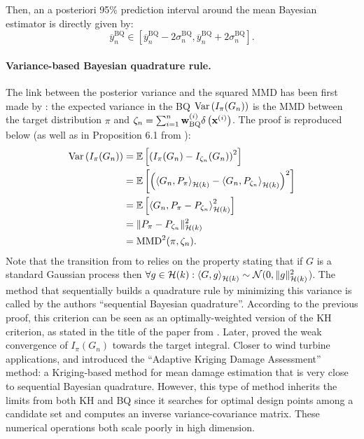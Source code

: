 Then, an a posteriori 95\% prediction interval around the mean Bayesian estimator is directly given by: 
\begin{equation}
   \overline{y}_n^{\mathrm{BQ}} \in \left[\overline{y}_n^{\mathrm{BQ}} - 2\sigma_n^{\mathrm{BQ}}, \overline{y}_n^{\mathrm{BQ}} + 2\sigma_n^{\mathrm{BQ}} \right].
\end{equation}

\paragraph{Variance-based Bayesian quadrature rule.}%
The link between the posterior variance and the squared MMD has been first made by \cite[Proposition 1]{husar_duvenaud_2012}: the expected variance in the BQ $\operatorname{Var}\left(I_{\pi}(G_n)\right)$ is the MMD between the target distribution $\pi$ and $\zeta_n = \sum_{i=1}^n \mathbf{w}_{\mathrm{BQ}}^{(i)} \delta\left({\bf x}^{(i)}\right)$. 
The proof is reproduced below (as well as in Proposition 6.1 from \citealp{kanagawa_2018}): 
\begin{subequations}
\begin{align}
    \operatorname{Var}\left(I_{\pi}(G_n)\right) &= \mathbb{E}\left[ \left(I_{\pi}(G_n) - I_{\zeta_n}(G_n)\right)^2\right]\\
    &= \mathbb{E}\left[ \left( \left\langle G_n, P_{\pi} \right\rangle_{\mathcal{H}(k)} - \left\langle G_n, P_{\zeta_n}\right\rangle_{\mathcal{H}(k)} \right)^2\right]\\ \label{eq:bq_v1}
    &= \mathbb{E}\left[ \left\langle G_n, P_{\pi} - P_{\zeta_n} \right\rangle_{\mathcal{H}(k)}^2\right]\\ \label{eq:bq_v2}
    &= \lVert P_{\pi} - P_{\zeta_n} \lVert^2_{\mathcal{H}(k)}\\ 
    &= \mathrm{MMD}^2(\pi, \zeta_n).
\end{align}
\end{subequations}
Note that the transition from  to  relies on the property stating that if $G$ is a standard Gaussian process then $\forall g \in \mathcal{H}(k) : \left\langle G, g \right\rangle_{\mathcal{H}(k)} \sim \mathcal{N}(0, \lVert g \lVert^2_{\mathcal{H}(k)}$). 
The method that sequentially builds a quadrature rule by minimizing this variance is called by the authors ``sequential Bayesian quadrature''. 
According to the previous proof, this criterion can be seen as an optimally-weighted version of the KH criterion, as stated in the title of the paper from \cite{husar_duvenaud_2012}. 
Later, \cite{briol_2015} proved the weak convergence of $I_{\pi}(G_n)$ towards the target integral. 
Closer to wind turbine applications, \cite{huchet_2018} and \cite{huchet_mattrand_2019} introduced the ``Adaptive Kriging Damage Assessment'' method: a Kriging-based method for mean damage estimation that is very close to sequential Bayesian quadrature. 
However, this type of method inherits the limits from both KH and BQ since it searches for optimal design points among a candidate set and computes an inverse variance-covariance matrix. 
These numerical operations both scale poorly in high dimension. 

